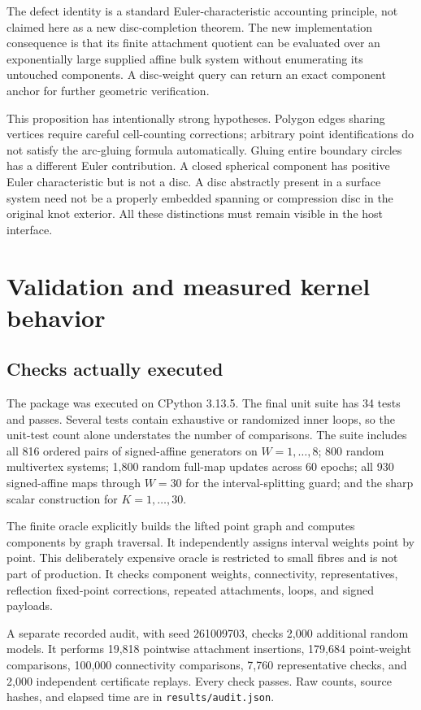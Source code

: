\documentclass[11pt]{article}
\theoremstyle{definition}
\newcommand{\code}[1]{\texttt{#1}}
\begin{document}
The defect identity is a standard Euler-characteristic accounting principle, not claimed here as a new disc-completion theorem. The new implementation consequence is that its finite attachment quotient can be evaluated over an exponentially large supplied affine bulk system without enumerating its untouched components. A disc-weight query can return an exact component anchor for further geometric verification.

This proposition has intentionally strong hypotheses. Polygon edges sharing vertices require careful cell-counting corrections; arbitrary point identifications do not satisfy the arc-gluing formula automatically. Gluing entire boundary circles has a different Euler contribution. A closed spherical component has positive Euler characteristic but is not a disc. A disc abstractly present in a surface system need not be a properly embedded spanning or compression disc in the original knot exterior. All these distinctions must remain visible in the host interface.

\section{Validation and measured kernel behavior}
\label{sec:validation}

\subsection{Checks actually executed}
The package was executed on CPython 3.13.5. The final unit suite has 34 tests and passes. Several tests contain exhaustive or randomized inner loops, so the unit-test count alone understates the number of comparisons. The suite includes all 816 ordered pairs of signed-affine generators on $W=1,\ldots,8$; 800 random multivertex systems; 1,800 random full-map updates across 60 epochs; all 930 signed-affine maps through $W=30$ for the interval-splitting guard; and the sharp scalar construction for $K=1,\ldots,30$.

The finite oracle explicitly builds the lifted point graph and computes components by graph traversal. It independently assigns interval weights point by point. This deliberately expensive oracle is restricted to small fibres and is not part of production. It checks component weights, connectivity, representatives, reflection fixed-point corrections, repeated attachments, loops, and signed payloads.

A separate recorded audit, with seed 261009703, checks 2,000 additional random models. It performs 19,818 pointwise attachment insertions, 179,684 point-weight comparisons, 100,000 connectivity comparisons, 7,760 representative checks, and 2,000 independent certificate replays. Every check passes. Raw counts, source hashes, and elapsed time are in \code{results/audit.json}.
\end{document}
